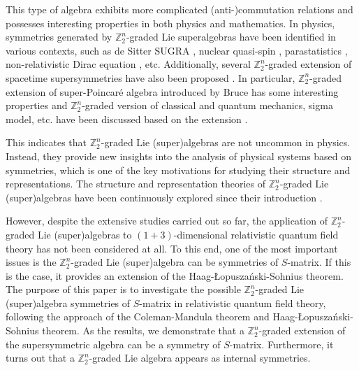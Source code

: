 \documentclass[a4paper,12pt]{article}
\def\Z{\mathbb{Z}}
\def\HLS{Haag-\L opusza\'nski-Sohnius }
\def\CM{Coleman-Mandula }
\theoremstyle{plain}
\theoremstyle{definition}
\begin{document}
This type of algebra exhibits more complicated (anti-)commutation relations and possesses interesting properties in both physics and mathematics. In physics, symmetries generated by $\Z_2^n$-graded Lie superalgebras have been identified in various contexts, such as de Sitter SUGRA \cite{Vas}, nuclear quasi-spin \cite{jyw},  parastatistics \cite{tol},  non-relativistic  Dirac  equation \cite{AKTT1,AKTT2}, etc. 
Additionally, several $\Z_2^n$-graded extension of spacetime supersymmetries have  also been proposed \cite{zhe,LR,Toro1,Toro2,tol2,Bruce}. In particular, $\Z_2^n$-graded extension of super-Poincar\'e algebra introduced by Bruce \cite{Bruce} has some interesting properties and $\Z_2^n$-graded version of classical and quantum mechanics,  sigma model, etc. have been discussed based on the extension \cite{BruDup,AAD,AAd2,AKTcl,AKTqu,DoiAi1,DoiAi2,AiDoi,brusigma,bruSG,AIKT,Topp,Topp2,AiItoTa,AiItoTa2}. 

This indicates that $\Z_2^n$-graded Lie (super)algebras are not uncommon in physics. Instead, they provide new insights into the analysis of physical systems based on symmetries, which is one of the key motivations for studying their structure and representations. 
The structure and representation theories of $\Z_2^n$-graded Lie (super)algebras have been continuously explored since their introduction \cite{sch3,SchZha,Sil,ChSiVO,SigSil,PionSil,CART,MohSal,NAJS,NAPIJS,StoVDJ,Meyer,IsStvdJ,NAPSIJSinf,NAKA,KTclassification,Meyer2,NeliJoris,NeliJoris2,LuTan,FaFaJ,AiSe}.

However, despite the extensive studies carried out so far, the application of $\Z_2^n$-graded Lie (super)algebras to $(1+3)$-dimensional relativistic quantum field theory has not been considered at all. To this end, one of the most important issues is the $\Z_2^n$-graded Lie (super)algebra can be symmetries of $S$-matrix. 
If this is the case, it provides an extension of the \HLS theorem.
The purpose of this paper is to investigate the possible \( \mathbb{Z}_2^n \)-graded Lie (super)algebra symmetries of $S$-matrix in relativistic quantum field theory, following the approach of the \CM theorem and \HLS theorem. 
As the results, 
we demonstrate that 
a $\Z_2^n$-graded extension of the supersymmetric algebra can be a symmetry of $S$-matrix. Furthermore, it turns out that a $\Z_2^n$-graded Lie algebra appears as internal symmetries.
\end{document}
